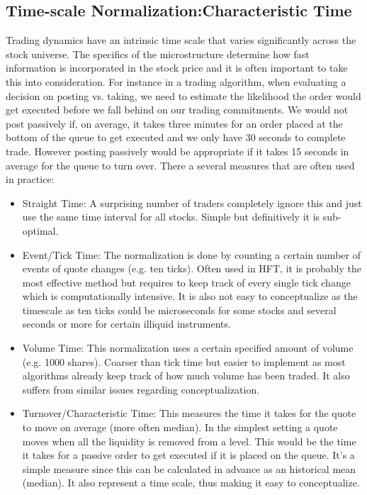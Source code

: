 \subsection{Time-scale Normalization:Characteristic Time}

Trading dynamics have an intrinsic time scale that varies significantly across the stock universe. The specifics of the microstructure determine how fast information is incorporated in the stock price and it is often important to take this into consideration. For instance in a trading algorithm, when evaluating a decision on posting vs. taking, we need to estimate the likelihood the order would get executed before we fall behind on our trading commitments. We would not post passively if, on average, it takes three minutes for an order placed at the bottom of the queue to get executed and we only have 30 seconds to complete trade. However posting passively would be appropriate if it takes 15 seconds in average for the queue to turn over. There a several measures that are often used in practice:
        \begin{itemize}
        \item Straight Time: A surprising number of traders completely ignore this and just use the same time interval for all stocks. Simple but definitively it is sub-optimal.
        \item Event/Tick Time: The normalization is done by counting a certain number of events of quote changes (e.g. ten ticks). Often used in HFT, it is probably the most effective method but requires to keep track of every single tick change which is computationally intensive. It is also not easy to conceptualize as the timescale as ten ticks could be microseconds for some stocks and several seconds or more for certain illiquid instruments.
        \item Volume Time: This normalization uses a certain specified amount of volume (e.g. 1000 shares). Coarser than tick time but easier to implement as most algorithms already keep track of how much volume has been traded. It also suffers from similar issues regarding conceptualization.
        \item Turnover/Characteristic Time: This measures the time it takes for the quote to move on average (more often median). In the simplest setting a quote moves when all the liquidity is removed from a level. This would be the time it takes for a passive order to get executed if it is placed on the queue. It's a simple measure since this can be calculated in advance as an historical mean (median). It also represent a time scale, thus making it easy to conceptualize.
        \end{itemize}


